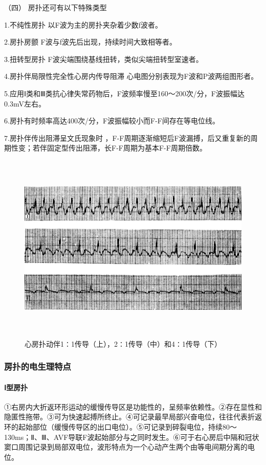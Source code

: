 \hypertarget{text00290.htmlux5cux23CHP10-2-3-2-2-4}{}
（四） 房扑还可有以下特殊类型

1.不纯性房扑 以F波为主的房扑夹杂着少数f波者。

2.房扑房颤 F波与f波先后出现，持续时间大致相等者。

3.扭转型房扑 F波尖端围绕基线扭转，类似尖端扭转型室速者。

4.房扑伴局限性完全性心房内传导阻滞 心电图分别表现为F波和P波两组图形者。

5.应用Ⅰ类和Ⅲ类抗心律失常药物后，F波频率慢至160～200次/分，F波振幅达0.3mV左右。

6.房扑有时频率高达400次/分，F波振幅较小而F-F间存在等电位线。

7.房扑伴传出阻滞呈文氏现象时
，F-F周期逐渐缩短后F波漏搏，后又重复新的周期性变；若伴固定型传出阻滞，长F-F周期为基本F-F周期倍数。

\begin{figure}[!htbp]
 \centering
 \includegraphics[width=6.29167in,height=3.58333in]{./images/Image00422.jpg}
 \captionsetup{justification=centering}
 \caption{心房扑动伴1∶1传导（上），2∶1传导（中）和4∶1传导（下）}
 \label{fig102-7}
  \end{figure} 

\subsubsection{房扑的电生理特点}

\paragraph{Ⅰ型房扑}

①右房内大折返环形运动的缓慢传导区是功能性的，呈频率依赖性。②存在显性和隐匿性拖带。③可为快速起搏所终止。④可记录最早局部兴奋电位，往往代表折返环的起始部位（缓慢传导区的出口电位）。⑤可记录到碎裂电位，持续80～130ms；Ⅱ、Ⅲ、AVF导联F波起始部分与之同时发生。⑥可于右心房后中隔和冠状窦口周围记录到局部双电位，波形特点为一个心动产生两个由等电间期分离的电位。


